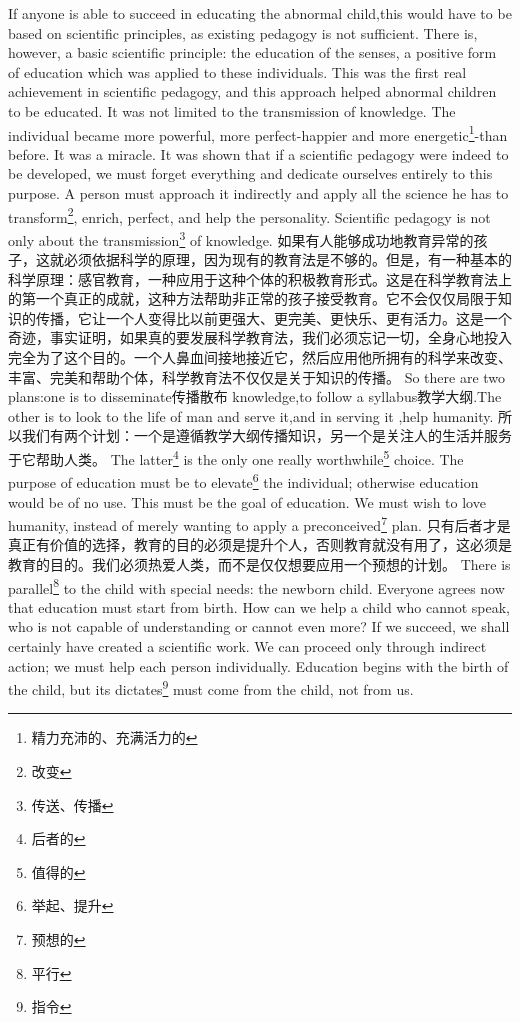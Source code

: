 \documentclass[lang=cn,10pt]{elegantbook}
\begin{document}
If anyone is able to succeed in educating the abnormal child,this would have to be based on scientific principles, as existing pedagogy is not sufficient. There is, however, a basic scientific principle: the education of the senses, a positive form of education which was applied to these individuals. This was the first real achievement in scientific pedagogy, and this approach helped abnormal children to be educated. It was not limited to the transmission of knowledge. The individual became more powerful, more perfect-happier and more energetic\footnote{精力充沛的、充满活力的}-than before. It was a miracle. It was shown that if a scientific pedagogy were indeed to be developed, we must forget everything and dedicate ourselves entirely to this purpose. A person must approach it indirectly and apply all the science he has to transform\footnote{改变}, enrich, perfect, and help the personality. Scientific pedagogy is not only about the transmission\footnote{传送、传播} of knowledge.
如果有人能够成功地教育异常的孩子，这就必须依据科学的原理，因为现有的教育法是不够的。但是，有一种基本的科学原理：感官教育，一种应用于这种个体的积极教育形式。这是在科学教育法上的第一个真正的成就，这种方法帮助非正常的孩子接受教育。它不会仅仅局限于知识的传播，它让一个人变得比以前更强大、更完美、更快乐、更有活力。这是一个奇迹，事实证明，如果真的要发展科学教育法，我们必须忘记一切，全身心地投入完全为了这个目的。一个人鼻血间接地接近它，然后应用他所拥有的科学来改变、丰富、完美和帮助个体，科学教育法不仅仅是关于知识的传播。
So there are two plans:one is to disseminate传播散布 knowledge,to follow a syllabus教学大纲.The other is to look to the life of man and serve it,and in serving it ,help humanity.
所以我们有两个计划：一个是遵循教学大纲传播知识，另一个是关注人的生活并服务于它帮助人类。
The latter\footnote{后者的} is the only one really worthwhile\footnote{值得的} choice. The purpose of education must be to elevate\footnote{举起、提升} the individual; otherwise education would be of no use. This must be the goal of education. We must wish to love humanity, instead of merely wanting to apply a preconceived\footnote{预想的} plan.
只有后者才是真正有价值的选择，教育的目的必须是提升个人，否则教育就没有用了，这必须是教育的目的。我们必须热爱人类，而不是仅仅想要应用一个预想的计划。
There is parallel\footnote{平行} to the child with special needs: the newborn child. Everyone agrees now that education must start from birth. How can we help a child who cannot speak, who is not capable of understanding or cannot even more? If we succeed, we shall certainly have created a scientific work. We can proceed only through indirect action; we must help each person individually. Education begins with the birth of the child, but its dictates\footnote{指令} must come from the child, not from us.
\end{document}

